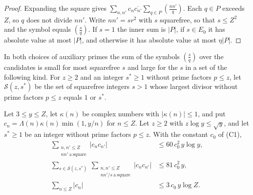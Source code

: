 \begin{proof}
Expanding the square gives $\sum_{n,n'}c_n\overline{c_{n'}}\sum_{q\in P}(\frac{nn'}q)$. Each $q\in P$ exceeds $Z$, so $q$ does not divide $nn'$. Write $nn'=sr^2$ with $s$ squarefree, so that $s\le Z^2$ and the symbol equals $(\frac sq)$. If $s=1$ the inner sum is $\lvert P\rvert$, if $s\in E_0$ it has absolute value at most $\lvert P\rvert$, and otherwise it has absolute value at most $\eta\lvert P\rvert$.
\end{proof}

In both choices of auxiliary primes the sum of the symbols $(\frac sq)$ over the candidates is small for most squarefree $s$ and large for the $s$ in a set of the following kind. For $z\ge2$ and an integer $s^\ast\ge1$ without prime factors $p\le z$, let $\mathcal S(z,s^\ast)$ be the set of squarefree integers $s>1$ whose largest divisor without prime factors $p\le z$ equals $1$ or $s^\ast$.

\begin{lemma}\label{coef}
Let $3\le y\le Z$, let $\kappa(n)$ be complex numbers with $\lvert\kappa(n)\rvert\le1$, and put $c_n=\Lambda(n)\kappa(n)\min(1,y/n)$ for $n\le Z$. Let $z\ge2$ with $z\log y\le\sqrt y$, and let $s^\ast\ge1$ be an integer without prime factors $p\le z$. With the constant $c_0$ of \textup{(C1)},
\begin{align*}
\sum_{\substack{n,n'\le Z\\ nn'\ \mathrm{a\ square}}}\lvert c_nc_{n'}\rvert&\le60\,c_0^2\,y\log y,\\
\sum_{s\in\mathcal S(z,s^\ast)}\ \sum_{\substack{n,n'\le Z\\ nn'/s\ \mathrm{a\ square}}}\lvert c_nc_{n'}\rvert&\le81\,c_0^2\,y,\\
\sum_{n\le Z}\lvert c_n\rvert&\le3\,c_0\,y\log Z .
\end{align*}
\end{lemma}

